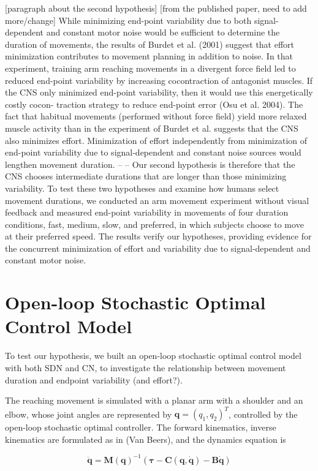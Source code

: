 [paragraph about the second hypothesis] [from the published paper, need to add more/change] While minimizing end-point variability due to both signal- dependent and constant motor noise would be sufficient to determine the duration of movements, the results of Burdet et al. (2001) suggest that effort minimization contributes to movement planning in addition to noise. In that experiment, training arm reaching movements in a divergent force field led to reduced end-point variability by increasing cocontraction of antagonist muscles. If the CNS only minimized end-point variability, then it would use this energetically costly cocon- traction strategy to reduce end-point error (Osu et al. 2004). The fact that habitual movements (performed without force field) yield more relaxed muscle activity than in the experiment of Burdet et al. suggests that the CNS also minimizes effort. Minimization of effort independently from minimization of end-point variability due to signal-dependent and constant noise sources would lengthen movement duration.  -- -- Our second hypothesis is therefore that the CNS chooses intermediate durations that are longer than those minimizing variability. To test these two hypotheses and examine how humans select movement durations, we conducted an arm movement experiment without visual feedback and measured end-point variability in movements of four duration conditions, fast, medium, slow, and preferred, in which subjects choose to move at their preferred speed. The results verify our hypotheses, providing evidence for the concurrent minimization of effort and variability due to signal-dependent and constant motor noise.

\section{Open-loop Stochastic Optimal Control Model}
To test our hypothesis, we built an open-loop stochastic optimal control model with both SDN and CN, to investigate the relationship between movement duration and endpoint variability (and effort?).

The reaching movement is simulated with a planar arm with a shoulder and an elbow, whose joint angles are represented by $\bm{q} = (q_1, q_2)^T$, controlled by the open-loop stochastic optimal controller. 
The forward kinematics, inverse kinematics are formulated as in (Van Beers), and the dynamics equation is

\begin{equation} \label{dynamics}
	\ddot{\bm{q}} = \bm{M}(\bm{q})^{-1} (\bm{\tau} - \bm{C}(\bm{q}, \dot{\bm{q}}) - \bm{B}\dot{\bm{q}})
\end{equation}


